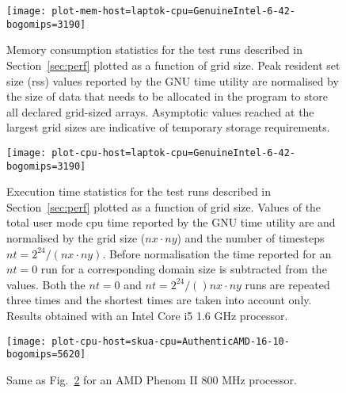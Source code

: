 \documentclass[final,5p,times,twocolumn]{elsarticle}
\begin{document}
  \begin{figure}
    \center
    \texttt{[image: plot-mem-host=laptok-cpu=GenuineIntel-6-42-bogomips=3190]}
    \caption{\label{fig:mem}
      Memory consumption statistics for the test runs described in Section~\ref{sec:perf}
        plotted as a function of grid size.
      Peak resident set size (rss) values reported by the GNU time utility are normalised by the size of
        data that needs to be allocated in the program to store all declared grid-sized arrays.
      Asymptotic values reached at the largest grid sizes are indicative 
        of temporary storage requirements.
    }
  \end{figure}
  \begin{figure}
    \center
    \texttt{[image: plot-cpu-host=laptok-cpu=GenuineIntel-6-42-bogomips=3190]}
    \caption{\label{fig:cpu-eyrie}
      Execution time statistics for the test runs described in Section~\ref{sec:perf}
        plotted as a function of grid size.
      Values of the total user mode cpu time reported by the GNU time utility are
        and normalised by the grid size ($nx \cdot ny$) and the number of timesteps $nt=2^{24}/(nx \cdot ny)$.
      Before normalisation the time reported for an $nt=0$ run for a corresponding
        domain size is subtracted from the values.
      Both the $nt=0$ and $nt=2^{24}/()nx \cdot ny$ runs are repeated three times and
        the shortest times are taken into account only.
      Results obtained with an Intel\textsuperscript{\textregistered} 
        Core\textsuperscript{\texttrademark} i5 1.6 GHz processor.
    }
  \end{figure}
  \begin{figure}
    \center
    \texttt{[image: plot-cpu-host=skua-cpu=AuthenticAMD-16-10-bogomips=5620]}
    \caption{\label{fig:cpu-skua}
      Same as Fig.~\ref{fig:cpu-eyrie} for an AMD Phenom\textsuperscript{\texttrademark} II 800 MHz processor.
    }
  \end{figure}
\end{document}
